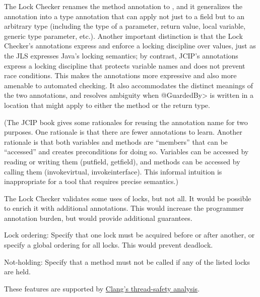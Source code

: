 The Lock Checker renames the method annotation to
, and it generalizes the
 annotation into a type annotation
that can apply not just to a field but to an arbitrary type (including the
type of a parameter, return value, local variable, generic type parameter,
etc.).  Another important distinction is that the Lock Checker's
annotations express and enforce a locking discipline over values, just as
the JLS expresses Java's locking semantics; by contrast, JCIP's annotations
express a locking discipline that protects variable names and does not
prevent race conditions.
  This makes the annotations more expressive and also more amenable
to automated checking.  It also accommodates the distinct
meanings of the two annotations, and resolves ambiguity when \<@GuardedBy>
is written in a location that might apply to either the method or the
return type.

(The JCIP book gives some rationales for reusing the annotation name for
two purposes.  One rationale is
that there are fewer annotations to learn.  Another rationale is
that both variables and methods are ``members'' that can be ``accessed''
and  creates preconditions for doing so.
Variables can be accessed by reading or writing them (putfield, getfield),
and methods can be accessed by calling them (invokevirtual,
invokeinterface).  This informal intuition is
inappropriate for a tool that requires precise semantics.)




The Lock Checker validates some uses of locks, but not all.  It would be
possible to enrich it with additional annotations.  This would increase the
programmer annotation burden, but would provide additional guarantees.

Lock ordering:  Specify that one lock must be acquired before or after
another, or specify a global ordering for all locks.  This would prevent
deadlock.

Not-holding:  Specify that a method must not be called if any of the listed
locks are held.

These features are supported by
\href{https://clang.llvm.org/docs/ThreadSafetyAnalysis.html}{Clang's
  thread-safety analysis}.


